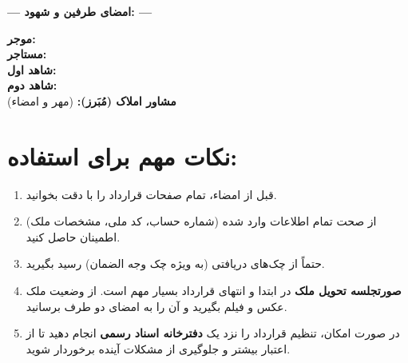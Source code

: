 \documentclass[14pt]{article}
\begin{document}
	\vspace{2cm}
	\centerline{\textbf{--- امضای طرفین و شهود: ---}}
	
	\vspace{1cm}
	\noindent
	\textbf{موجر:}
	\hrulefill
	\\
	\vspace{0.5cm}
	\textbf{مستاجر:}
	\hrulefill
	\\
	\vspace{0.5cm}
	\textbf{شاهد اول:}
	\hrulefill
	\\
	\vspace{0.5cm}
	\textbf{شاهد دوم:}
	\hrulefill
	\\
	\vspace{0.5cm}
	\textbf{مشاور املاک (مُبَرز):}
	\hrulefill
	\hspace{1cm} (مهر و امضاء)
	
	\vspace{2cm}
	\section*{\textbf{نکات مهم برای استفاده:}}
	\begin{enumerate}
		\item قبل از امضاء، تمام صفحات قرارداد را با دقت بخوانید.
		\item از صحت تمام اطلاعات وارد شده (شماره حساب، کد ملی، مشخصات ملک) اطمینان حاصل کنید.
		\item حتماً از چک‌های دریافتی (به ویژه چک وجه الضمان) رسید بگیرید.
		\item
		\textbf{صورتجلسه تحویل ملک} در ابتدا و انتهای قرارداد بسیار مهم است. از وضعیت ملک عکس و فیلم بگیرید و آن را به امضای دو طرف برسانید.
		\item در صورت امکان، تنظیم قرارداد را نزد یک
		\textbf{دفترخانه اسناد رسمی} انجام دهید تا از اعتبار بیشتر و جلوگیری از مشکلات آینده برخوردار شوید.
	\end{enumerate}
	
\end{document}
